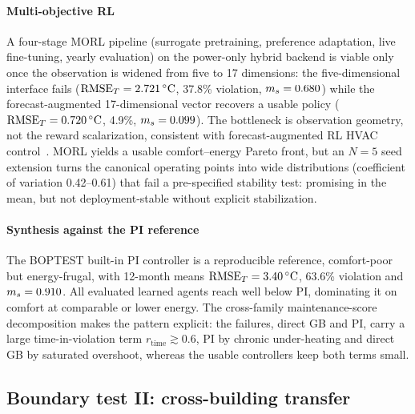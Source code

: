 \paragraph{Multi-objective RL}
A four-stage MORL pipeline (surrogate pretraining, preference adaptation, live fine-tuning, yearly
evaluation) on the power-only hybrid backend is viable only once the observation is widened from
five to 17 dimensions: the five-dimensional interface fails
($\mathrm{RMSE}_T=\SI{2.721}{\celsius}$, 37.8\% violation, $m_s=0.680$) while the forecast-augmented
17-dimensional vector recovers a usable policy ($\mathrm{RMSE}_T=\SI{0.720}{\celsius}$, 4.9\%,
$m_s=0.099$). The bottleneck is observation geometry, not the reward scalarization, consistent with
forecast-augmented RL HVAC control~\cite{Gao2024Predictive}. MORL yields a usable comfort--energy
Pareto front, but an $N=5$ seed extension turns the canonical operating points into wide
distributions (coefficient of variation 0.42--0.61) that fail a pre-specified stability test:
promising in the mean, but not deployment-stable without explicit stabilization.

\paragraph{Synthesis against the PI reference}
The BOPTEST built-in PI controller is a reproducible reference, comfort-poor but energy-frugal, with
12-month means $\mathrm{RMSE}_T=\SI{3.40}{\celsius}$, 63.6\% violation and $m_s=0.910$. All evaluated
learned agents reach \ms{} well below PI, dominating it on comfort at comparable or lower energy.
The cross-family maintenance-score decomposition makes the pattern explicit: the failures, direct GB
and PI, carry a large time-in-violation term $r_{\mathrm{time}}\gtrsim0.6$, PI by chronic
under-heating and direct GB by saturated overshoot, whereas the usable controllers keep both terms
small.

\subsection{Boundary test II: cross-building transfer}\label{sec:transfer}

